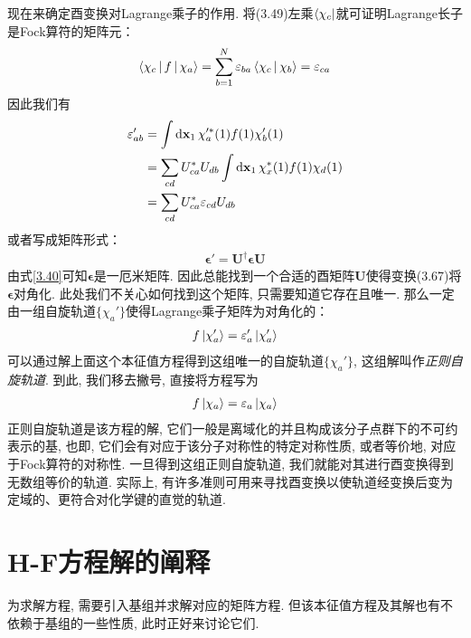 现在来确定酉变换对Lagrange乘子的作用. 将(3.49)左乘$\Bra{\chi_c}$就可证明Lagrange长子是Fock算符的矩阵元：
\begin{align}
\Braket{\chi_c|f|\chi_a} = \sum_{b=1}^{N}\varepsilon_{ba}\Braket{\chi_c|\chi_b} = \varepsilon_{ca}
\end{align}
因此我们有
\begin{align}
\epsilon_{ab}' & = \int\dd{x}_1\,\chi_a^{\prime *}(1)f(1)\chi_b'(1)\notag\\
               & = \sum_{cd}U_{ca}^* U_{db}\int\dd{x}_1\,\chi_x^*(1)f(1)\chi_d(1)\notag\\
               & = \sum_{cd}U_{ca}^* \epsilon_{cd} U_{db}
\end{align}
或者写成矩阵形式：
\begin{align}
\bm{\epsilon}' = \mathbf{U}^\dagger \bm{\epsilon}\mathbf{U}
\end{align}
由式\eqref{3.40}可知$\bm{\epsilon}$是一厄米矩阵. 因此总能找到一个合适的酉矩阵$\mathbf{U}$使得变换(3.67)将$\bm{\epsilon}$对角化. 此处我们不关心如何找到这个矩阵, 只需要知道它存在且唯一. 那么一定由一组自旋轨道$\{\chi_a'\}$使得Lagrange乘子矩阵为对角化的：
\begin{align}
f\Ket{\chi_a'} = \varepsilon_a'\Ket{\chi_a'}
\end{align}
可以通过解上面这个本征值方程得到这组唯一的自旋轨道$\{\chi_a'\}$, 这组解叫作\emph{正则自旋轨道}. 到此, 我们移去撇号, 直接将\hft 方程写为
\begin{align}
f\Ket{\chi_a} = \varepsilon_a\Ket{\chi_a}
\end{align}
正则自旋轨道是该方程的解, 它们一般是离域化的并且构成该分子点群下的不可约表示的基, 也即, 它们会有对应于该分子对称性的特定对称性质, 或者等价地, 对应于Fock算符的对称性. 一旦得到这组正则自旋轨道, 我们就能对其进行酉变换得到无数组等价的轨道. 实际上, 有许多准则可用来寻找酉变换以使轨道经变换后变为定域的、更符合对化学键的直觉的轨道.
\section{H-F方程解的阐释}
为求解\hft 方程, 需要引入基组并求解对应的矩阵方程. 但该本征值方程及其解也有不依赖于基组的一些性质, 此时正好来讨论它们.
